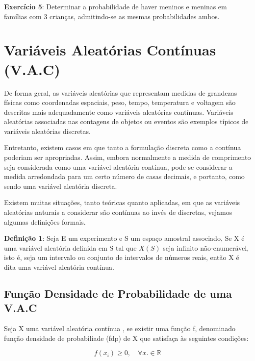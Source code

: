 \textbf{Exercício 5}: Determinar a probabilidade de haver meninos
e meninas em famílias com 3 crianças, admitindo-se as mesmas
probabilidades ambos.

\newpage

\section{Variáveis Aleatórias Contínuas (V.A.C)}

De forma geral, as variáveis aleatórias que representam medidas de grandezas físicas como coordenadas espaciais, peso, tempo,
temperatura e voltagem são descritas mais adequadamente como variáveis aleatórias contínuas. Variáveis aleatórias associadas nas contagens de objetos ou eventos são exemplos típicos de variáveis aleatórias discretas.\vskip0.3cm

Entretanto, existem casos em que tanto a formulação discreta como a contínua poderiam ser apropriadas. Assim, embora normalmente a medida de comprimento seja considerada como uma variável aleatória contínua, pode-se considerar a medida arredondada para um certo número de casas decimais, e portanto, como sendo uma variável aleatória discreta.\vskip0.3cm


Existem muitas situações, tanto teóricas quanto aplicadas, em que
as variáveis aleatórias naturais a considerar são contínuas ao
invés de discretas, vejamos algumas definições formais.\vskip0.3cm


\textbf{Definição 1}: Seja E um experimento e S um espaço amostral
associado, Se X é uma variável aleatória definida em S tal que
$X(S)$ seja infinito não-enumerável, isto é, seja um intervalo ou
conjunto de intervalos de números reais, então X é dita uma
variável aleatória contínua.



\subsection{Função Densidade de Probabilidade de uma V.A.C}

Seja X uma variável aleatória contínua , se existir uma função f,
denominado função densidade de probabiliade (fdp) de X que
satisfaça às seguintes condições:


\begin{equation}\label{}
    f(x_{i}) \geq 0, \quad \forall x.\in \mathbb{R}
\end{equation}


